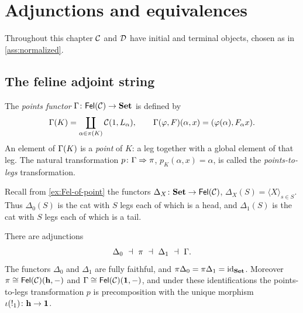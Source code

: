 \chapter{Adjunctions and equivalences}\label{ch:adjunctions}

\begin{assumption}\label{ass:ch7}
Throughout this chapter $\mathcal{C}$ and $\mathcal{D}$ have initial and terminal objects,
chosen as in \cref{ass:normalized}.
\end{assumption}

\section{The feline adjoint string}\label{sec:string}

\begin{definition}\label{def:points}
The \emph{points functor} $\Gamma\colon\mathsf{Fel}(\mathcal{C})\to\mathbf{Set}$ is defined by
\[
\Gamma(K)=\coprod_{\alpha\in\pi(K)}\mathcal{C}(1,L_\alpha),\qquad
\Gamma(\varphi,F)(\alpha,x)=(\varphi(\alpha),F_\alpha x).
\]
An element of $\Gamma(K)$ is a \emph{point} of $K$: a leg together with a
global element of that leg. The natural transformation
$p\colon\Gamma\Rightarrow\pi$, $p_K(\alpha,x)=\alpha$, is called the
\emph{points-to-legs} transformation.
\end{definition}

Recall from \cref{ex:Fel-of-point} the functors $\Delta_X\colon\mathbf{Set}\to\mathsf{Fel}(\mathcal{C})$,
$\Delta_X(S)=\langle X\rangle_{s\in S}$. Thus $\Delta_0(S)$ is the cat with
$S$ legs each of which is a head, and $\Delta_1(S)$ is the cat with $S$ legs
each of which is a tail.

\begin{theorem}\label{thm:adjoint-string}
There are adjunctions
\[
\Delta_0\ \dashv\ \legs\ \dashv\ \Delta_1\ \dashv\ \points .
\]
The functors $\Delta_0$ and $\Delta_1$ are fully faithful, and
$\pi\Delta_0=\pi\Delta_1=\mathrm{id}_{\mathbf{Set}}$. Moreover $\pi\cong\mathsf{Fel}(\mathcal{C})(\mathbf{h},-)$
and $\Gamma\cong\mathsf{Fel}(\mathcal{C})(\mathbf{1},-)$, and under these identifications the
points-to-legs transformation $p$ is precomposition with the unique morphism
$\iota({!_1})\colon\mathbf{h}\to\mathbf{1}$.
\end{theorem}

